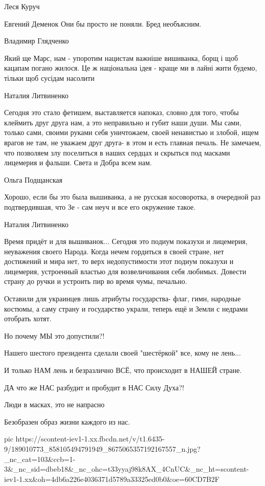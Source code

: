Леся Куруч

Евгений Деменок Они бы просто не поняли. Бред необъясним.

Владимир Глядченко

Який ще Марс, нам - упоротим нацистам важніше вишиванка, борщ і щоб кацапам
погано жилося. Це ж національна ідея - краще ми в лайні жити будемо, тільки щоб
сусідам насолити

Наталия Литвиненко

Сегодня это стало фетишем, выставляется напоказ, словно для того, чтобы
клеймить друг друга нам, а это неправильно и губит наши души.  Мы сами, только
сами, своими руками себя уничтожаем, своей ненавистью и злобой, ищем врагов не
там, не уважаем друг друга- в этом и есть главная печаль.  Не замечаем, что
позволяем злу поселиться в наших сердцах и скрыться под масками лицемерия и
фальши.  Света и Добра всем нам.

Ольга Подщанская

Хорошо, если бы это была вышиванка, а не русская косоворотка, в очередной раз
подтвердившая, что Зе - сам неуч и все его окружение такое.

Наталия Литвиненко

Время придёт и для вышиванок...
Сегодня это подиум показухи и лицемерия, неуважения своего Народа.
Когда нечем гордиться в своей стране, нет достижений и мира нет, то верх недопустимости этот подиум показухи и лицемерия, устроенный властью для возвеличивания себя любимых.
Довести страну до ручки и устроить пир во время чумы, печально.

Оставили для украинцев лишь атрибуты государства- флаг, гимн, народные костюмы,
а саму страну и государство украли, теперь ещё и Земли с недрами отобрать
хотят.

Но почему МЫ это допустили?!

Нашего шестого президента сделали своей "шестёркой" все, кому не лень...

И только НАМ лень и безразлично ВСЁ, что происходит в НАШЕЙ стране.

ДА что же НАС разбудит и пробудит в НАС Силу Духа?!

Люди в масках, это не напрасно

Безобразен образ жизни каждого из нас.

\ifcmt
  pic https://scontent-iev1-1.xx.fbcdn.net/v/t1.6435-9/189010773_858105494791949_8675065357192167557_n.jpg?_nc_cat=103&ccb=1-3&_nc_sid=dbeb18&_nc_ohc=t33yyaj98k8AX_4CnUC&_nc_ht=scontent-iev1-1.xx&oh=4db6a226e4036371d5789a33325ed0b0&oe=60CD7B2F
\fi

